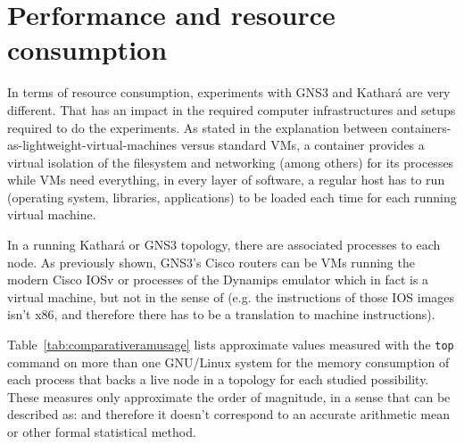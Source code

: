 \section{Performance and resource consumption}
\label{sec:comparativeperformance}

In terms of resource consumption, experiments with GNS3 and Kathará are very different.
That has an impact in the required computer infrastructures and setups required to do the experiments.
As stated in the explanation between containers-as-lightweight-virtual-machines versus standard VMs, a container provides a virtual isolation of the filesystem and networking (among others) for its processes while VMs need everything, in every layer of software, a regular host has to run (operating system, libraries, applications) to be loaded each time for each running virtual machine.

In a running Kathará or GNS3 topology, there are associated processes to each node.
As previously shown, GNS3's Cisco routers can be VMs running the modern Cisco IOSv or processes of the Dynamips emulator which in fact is a virtual machine, but not in the sense of  (e.g. the instructions of those IOS images isn't x86, and therefore there has to be a translation to machine instructions).

Table~\ref{tab:comparativeramusage} lists approximate values measured with the \texttt{top} command on more than one GNU/Linux system for the memory consumption of each process that backs a live node in a topology for each studied possibility.
These measures only approximate the order of magnitude, in a sense that can be described as:  and therefore it doesn't correspond to an accurate arithmetic mean or other formal statistical method.



